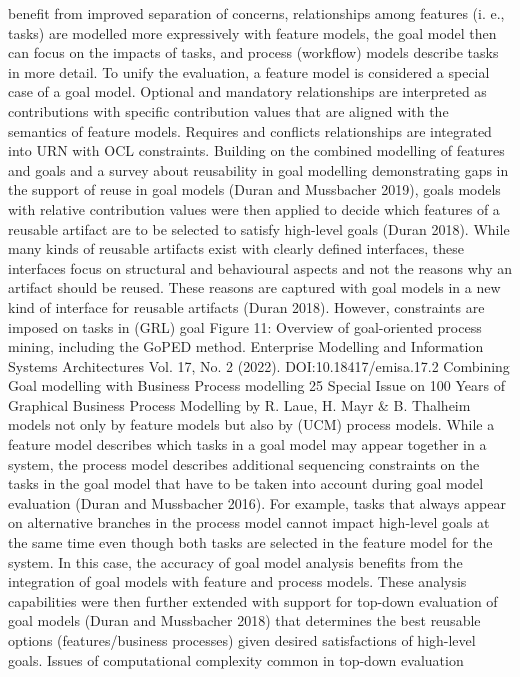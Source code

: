 benefit from improved separation of concerns,
relationships among features (i. e., tasks) are modelled more expressively with feature models, the
goal model then can focus on the impacts of tasks,
and process (workflow) models describe tasks in
more detail. To unify the evaluation, a feature
model is considered a special case of a goal model.
Optional and mandatory relationships are interpreted as contributions with specific contribution
values that are aligned with the semantics of feature models. Requires and conflicts relationships
are integrated into URN with OCL constraints.
Building on the combined modelling of features and goals and a survey about reusability in
goal modelling demonstrating gaps in the support
of reuse in goal models (Duran and Mussbacher
2019), goals models with relative contribution
values were then applied to decide which features
of a reusable artifact are to be selected to satisfy
high-level goals (Duran 2018). While many kinds
of reusable artifacts exist with clearly defined interfaces, these interfaces focus on structural and
behavioural aspects and not the reasons why an
artifact should be reused. These reasons are captured with goal models in a new kind of interface
for reusable artifacts (Duran 2018). However,
constraints are imposed on tasks in (GRL) goal
Figure 11: Overview of goal-oriented process mining, including the GoPED method.
Enterprise Modelling and Information Systems Architectures
Vol. 17, No. 2 (2022). DOI:10.18417/emisa.17.2
Combining Goal modelling with Business Process modelling 25
Special Issue on 100 Years of Graphical Business Process Modelling by R. Laue, H. Mayr & B. Thalheim
models not only by feature models but also by
(UCM) process models. While a feature model
describes which tasks in a goal model may appear
together in a system, the process model describes
additional sequencing constraints on the tasks
in the goal model that have to be taken into account during goal model evaluation (Duran and
Mussbacher 2016). For example, tasks that always appear on alternative branches in the process
model cannot impact high-level goals at the same
time even though both tasks are selected in the
feature model for the system. In this case, the
accuracy of goal model analysis benefits from
the integration of goal models with feature and
process models. These analysis capabilities were
then further extended with support for top-down
evaluation of goal models (Duran and Mussbacher
2018) that determines the best reusable options
(features/business processes) given desired satisfactions of high-level goals. Issues of computational complexity common in top-down evaluation
